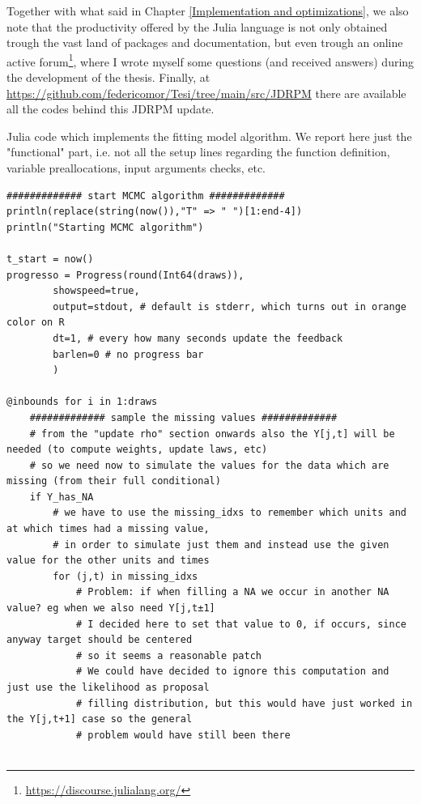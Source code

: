 \documentclass[12pt,	%
	a4paper,		%
	twoside,		%
	openright,		%
	titlepage,%
	]{book}
\theoremstyle{definition}
\newenvironment{code}{\captionsetup{type=listing}}{}
\begin{document}
Together with what said in Chapter \ref{Implementation and optimizations}, we also note that the productivity offered by the Julia language is not only obtained trough the vast land of packages and documentation, but even trough an online active forum\footnote{\url{https://discourse.julialang.org/}}, where I wrote myself some questions (and received answers) during the development of the thesis. Finally, at \url{https://github.com/federicomor/Tesi/tree/main/src/JDRPM} there are available all the codes behind this JDRPM update. 


\begin{code}
\caption[Julia code for model fit.]{Julia code which implements the fitting model algorithm. We report here just the "functional" part, i.e. not all the setup lines regarding the function definition, variable preallocations, input arguments checks, etc.}
\begin{verbatim}
############# start MCMC algorithm #############
println(replace(string(now()),"T" => " ")[1:end-4])
println("Starting MCMC algorithm")

t_start = now()
progresso = Progress(round(Int64(draws)),
		showspeed=true,
		output=stdout, # default is stderr, which turns out in orange color on R
		dt=1, # every how many seconds update the feedback
		barlen=0 # no progress bar
		)

@inbounds for i in 1:draws
	############# sample the missing values #############
	# from the "update rho" section onwards also the Y[j,t] will be needed (to compute weights, update laws, etc)
	# so we need now to simulate the values for the data which are missing (from their full conditional)
	if Y_has_NA
		# we have to use the missing_idxs to remember which units and at which times had a missing value,
		# in order to simulate just them and instead use the given value for the other units and times
		for (j,t) in missing_idxs
			# Problem: if when filling a NA we occur in another NA value? eg when we also need Y[j,t±1]
			# I decided here to set that value to 0, if occurs, since anyway target should be centered
			# so it seems a reasonable patch
			# We could have decided to ignore this computation and just use the likelihood as proposal
			# filling distribution, but this would have just worked in the Y[j,t+1] case so the general
			# problem would have still been there


\end{verbatim}
\end{code}
\end{document}
